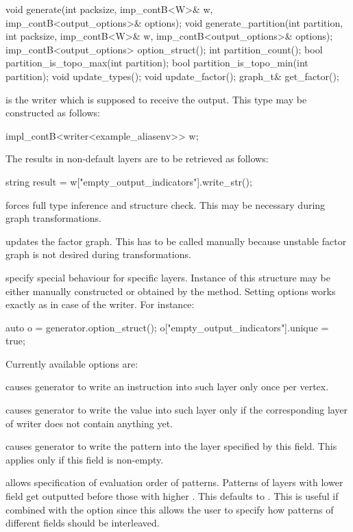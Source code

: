 \mybeginfig
\begin{code}
void generate(int packsize, 
    imp_contB<W>& w, imp_contB<output_options>& options); 
void generate_partition(int partition, int packsize, 
    imp_contB<W>& w, imp_contB<output_options>& options);
imp_contB<output_options> option_struct();
int partition_count();
bool partition_is_topo_max(int partition);
bool partition_is_topo_min(int partition);
void update_types();
void update_factor();
graph_t& get_factor();
\end{code}

\begin{description}
\item {} is the writer which is supposed to receive the output. This type may be constructed as follows:
\begin{code}
impl_contB<writer<example_aliasenv>> w;
\end{code}
 The results in non-default layers are to be retrieved as follows:
\begin{code}
string result = w["empty_output_indicators"].write_str();
\end{code}
\item {} forces full type inference and structure check. This may be necessary during graph transformations.
\item {} updates the factor graph. This has to be called manually because unstable factor graph is not desired during transformations.
\item {} specify special behaviour for specific layers. Instance of this structure may be either manually constructed or obtained by the  method. Setting options works exactly as in case of the writer. For instance:
\begin{code}
auto o = generator.option_struct();
o["empty_output_indicators"].unique = true;
\end{code}
Currently available options are:
\begin{description}
\item {} causes generator to write an instruction into such layer only once per vertex.
\item {} causes generator to write the value into such layer only if the corresponding layer of writer does not contain anything yet.
\item {} causes generator to write the pattern into the layer specified by this field. This applies only if this field is non-empty.
\item {} allows specification of evaluation order of patterns. Patterns of layers with lower  field get outputted before those with higher . This defaults to . This is useful if combined with the  option since this allows the user to specify how patterns of different fields should be interleaved. 
\end{description}
\end{description}


